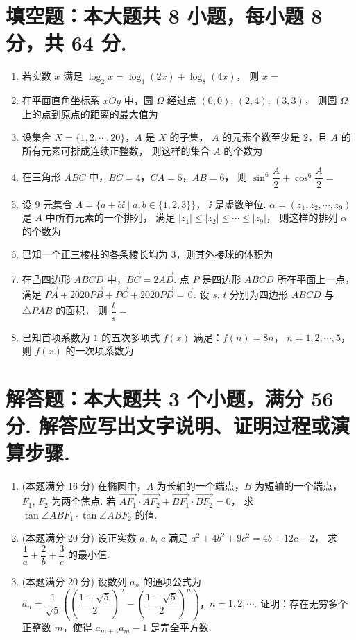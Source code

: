 \documentclass{chsmc}
\begin{document}
\section{填空题：本大题共 8 小题，每小题 8 分，共 64 分.}

\begin{enumerate}
  \item 若实数 $x$ 满足 $\log_2 x = \log_4(2x) + \log_8(4x)$，
    则 $x =$ \blankline
  \item 在平面直角坐标系 $xOy$ 中，圆 $\Omega$ 经过点 $(0,0)$, $(2,4)$, $(3,3)$，
    则圆 $\Omega$ 上的点到原点的距离的最大值为 \blankline
  \item 设集合 $X = \{1, 2, \cdots, 20\}$，$A$ 是 $X$ 的子集，
    $A$ 的元素个数至少是 $2$，且 $A$ 的所有元素可排成连续正整数，
    则这样的集合 $A$ 的个数为 \blankline
  \item 在三角形 $ABC$ 中，$BC = 4$，$CA = 5$，$AB = 6$，
    则 $\sin^6\dfrac{A}{2} + \cos^6\dfrac{A}{2} =$ \blankline
  \item 设 $9$ 元集合 $A = \{a + b\ii \mid a, b \in \{1, 2, 3\}\}$，
    $\ii$ 是虚数单位. $\alpha = (z_1, z_2, \cdots, z_9)$ 是 $A$ 中所有元素的一个排列，
    满足 $|z_1| \leqslant |z_2| \leqslant \cdots \leqslant |z_9|$，
    则这样的排列 $\alpha$ 的个数为 \blankline
  \item 已知一个正三棱柱的各条棱长均为 $3$，则其外接球的体积为 \blankline
  \item 在凸四边形 $ABCD$ 中，$\overrightarrow{BC} = 2\overrightarrow{AD}$.
    点 $P$ 是四边形 $ABCD$ 所在平面上一点，满足
    $\overrightarrow{PA} + 2020\overrightarrow{PB} + \overrightarrow{PC} + 2020\overrightarrow{PD} = \vec{0}$.
    设 $s$, $t$ 分别为四边形 $ABCD$ 与 $\triangle PAB$ 的面积，
    则 $\dfrac{t}{s} =$ \blankline
  \item 已知首项系数为 $1$ 的五次多项式 $f(x)$ 满足：$f(n) = 8n$，
    $n = 1, 2, \cdots, 5$，则 $f(x)$ 的一次项系数为 \blankline
\end{enumerate}

\section{解答题：本大题共 3 个小题，满分 56 分. 解答应写出文字说明、证明过程或演算步骤.}

\begin{enumerate}[resume]
  \item (本题满分 16 分) 在椭圆中，$A$ 为长轴的一个端点，$B$ 为短轴的一个端点，
    $F_1$, $F_2$ 为两个焦点. 若
    $\overrightarrow{AF_1}\cdot\overrightarrow{AF_2} + \overrightarrow{BF_1}\cdot\overrightarrow{BF_2} = 0$，
    求 $\tan\angle ABF_1 \cdot \tan\angle ABF_2$ 的值.
  \item (本题满分 20 分) 设正实数 $a$, $b$, $c$ 满足
    $a^2 + 4b^2 + 9c^2 = 4b + 12c - 2$，
    求 $\dfrac{1}{a} + \dfrac{2}{b} + \dfrac{3}{c}$ 的最小值.
  \item (本题满分 20 分) 设数列 $a_n$ 的通项公式为
    $a_n = \dfrac{1}{\sqrt{5}}\left(\left(\dfrac{1+\sqrt{5}}{2}\right)^n
    - \left(\dfrac{1-\sqrt{5}}{2}\right)^n\right)$，$n = 1, 2, \cdots$.
    证明：存在无穷多个正整数 $m$，使得 $a_{m+4}a_m - 1$ 是完全平方数.
\end{enumerate}
\end{document}
